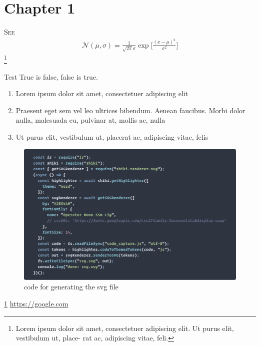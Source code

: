 \documentclass[single]{ubook}
\begin{document}
\thispagestyle{plain}
\section{Chapter 1}\label{a:temp1}
\lettrine[lines=2, nindent=0pt, findent=0.5em]{S}{ee} \lipsum[1]
\begin{align}
  \mathcal{N}(\mu, \sigma) = \frac{1}{\sqrt{2\pi}\sigma}\exp\biggl[\frac{(x-\mu)^2}{\sigma^2}\biggr]
\end{align}
\lipsum[1]\footnote[1]{Lorem ipsum dolor sit amet, consectetuer adipiscing elit. Ut purus elit, vestibulum ut, place-
rat ac, adipiscing vitae, feli.}

\begin{theorem}{Test}
  True is false, false is true.
\end{theorem}
\lipsum[1]
\begin{enumerate}
  \item Lorem ipsum dolor sit amet, consectetuer adipiscing elit
  \item Praesent eget sem vel leo ultrices bibendum. Aenean faucibus. Morbi dolor nulla,
  malesuada eu, pulvinar at, mollis ac, nulla
  \item Ut purus elit, vestibulum ut, placerat ac, adipiscing vitae, felis
\end{enumerate}
\lipsum[1]
\begin{figure}[h]
  \centering
  \includegraphics[width=\linewidth]{cc/svg.pdf}
  \caption{code for generating the svg file}
\end{figure}
\lipsum[1-5]\ref{a:temp1}
\url{https://google.com}
\end{document}
